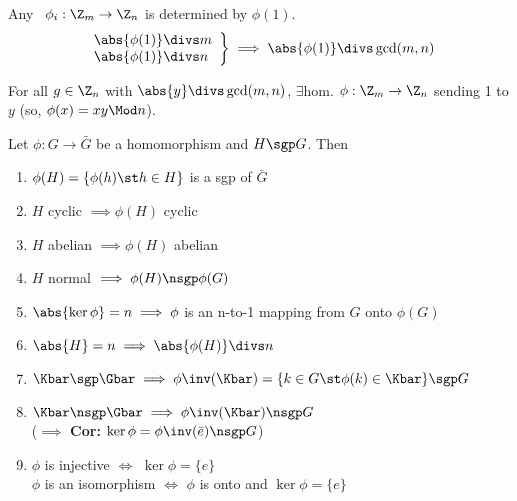   \begin{example}
      Any \homo\ \(\phi_i: \Z_m\to\Z_n\) is determined by \(\phi(1)\).
       \begin{align*}
          \left.
             \begin{array}{l}
              \abs{\phi(1)} \divs m \\ \abs{\phi(1)} \divs n
          \end{array}
          \right\}\implies \abs{\phi(1)} \divs \gcd(m,n)
       \end{align*}
  \end{example}

  \begin{exercise}
    For all \(g\in\Z_n\) with \(\abs{y}\divs\gcd(m,n)\), $\exists$hom. \(\phi:\Z_m\to\Z_n\) sending 1 to \(y\) (so, \(\phi(x)=xy\Mod n\)).
  \end{exercise}

  \begin{theorem}
      Let \(\phi: G\to\bar G\) be a homomorphism and \(H\sgp G\). Then
      \begin{enumerate}
          \item \(\phi(H)=\{\phi(h)\st h\in H\}\) is a sgp of \(\bar G\)
          \item \(H\) cyclic \(\implies \phi(H)\) cyclic
          \item \(H\) abelian \(\implies \phi(H)\) abelian
          \item \(H\) normal \(\implies \phi(H) \nsgp \phi(G)\)
          \item \(\abs{\ker\phi} = n \implies \phi\) is an n-to-1 mapping from \(G\) onto \(\phi(G)\)
          \item \(\abs{H} = n \implies \abs{\phi(H)} \divs n\)
          \item \(\Kbar \sgp \Gbar \implies \phi\inv(\Kbar)=\{k\in G\st \phi(k)\in\Kbar\}\sgp G\)
          \item \(\Kbar \nsgp \Gbar \implies \phi\inv(\Kbar) \nsgp G\) \\
          (\(\implies\) \textbf{Cor:} \(\ker\phi = \phi\inv(\bar{e}) \nsgp G\))
          \item \(\phi\) is injective \(\iff\) \(\ker\phi=\{e\}\) \\
          \(\phi\) is an isomorphism \(\iff\) \(\phi\) is onto and \(\ker\phi=\{e\}\)
      \end{enumerate}
  \end{theorem}

